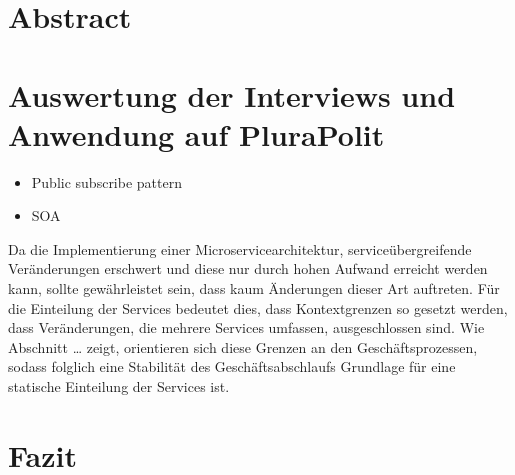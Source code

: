 \documentclass[a4paper, 12pt, headsepline]{scrartcl}
\begin{document}


\newpage
{}

\section*{Abstract}

\newpage

\tableofcontents

\newpage
{}
\setcounter{page}{1}


\newpage



\newpage



\newpage

\section{Auswertung der Interviews und Anwendung auf PluraPolit}
\begin{itemize}
	\item Public subscribe pattern
	\item SOA 
\end{itemize}

Da die Implementierung einer Microservicearchitektur, serviceübergreifende Veränderungen erschwert und diese nur durch hohen Aufwand erreicht werden kann, sollte gewährleistet sein, dass kaum Änderungen dieser Art auftreten. Für die Einteilung der Services bedeutet dies, dass Kontextgrenzen so gesetzt werden, dass Veränderungen, die mehrere Services umfassen, ausgeschlossen sind. Wie Abschnitt … zeigt, orientieren sich diese Grenzen an den Geschäftsprozessen, sodass folglich eine Stabilität des Geschäftsabschlaufs Grundlage für eine statische Einteilung der Services ist.

\section{Fazit}

\newpage

\printbibliography[title=Literaturverzeichnis]

\newpage

\listoffigures

\newpage


\end{document}
